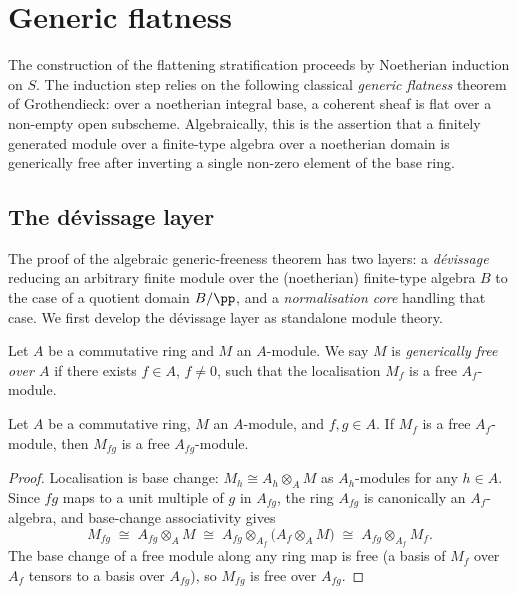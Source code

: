 \section{Generic flatness}
\label{sec:generic_flatness}

The construction of the flattening stratification proceeds by Noetherian
induction on \(S\). The induction step relies on the following classical
\emph{generic flatness} theorem of Grothendieck: over a noetherian integral
base, a coherent sheaf is flat over a non-empty open subscheme. Algebraically,
this is the assertion that a finitely generated module over a finite-type
algebra over a noetherian domain is generically free after inverting a single
non-zero element of the base ring.

\subsection{The dévissage layer}
\label{sec:generic_freeness_devissage}

The proof of the algebraic generic-freeness theorem has two layers: a
\emph{dévissage} reducing an arbitrary finite module over the (noetherian)
finite-type algebra \(B\) to the case of a quotient domain \(B/\pp\), and a
\emph{normalisation core} handling that case. We first develop the dévissage
layer as standalone module theory.

\begin{definition}
  \label{def:generically_free}
  Let \(A\) be a commutative ring and \(M\) an \(A\)-module.  We say \(M\) is
  \emph{generically free over \(A\)} if there exists \(f \in A\), \(f \ne 0\),
  such that the localisation \(M_f\) is a free \(A_f\)-module.
\end{definition}

\begin{lemma}
  \label{lem:generically_free_transport}
  Let \(A\) be a commutative ring, \(M\) an \(A\)-module, and \(f, g \in A\).
  If \(M_f\) is a free \(A_f\)-module, then \(M_{fg}\) is a free
  \(A_{fg}\)-module.
\end{lemma}

\begin{proof}
\leanok
  Localisation is base change: \(M_h \cong A_h \otimes_A M\) as
  \(A_h\)-modules for any \(h \in A\).  Since \(fg\) maps to a unit multiple
  of \(g\) in \(A_{fg}\), the ring \(A_{fg}\) is canonically an
  \(A_f\)-algebra, and base-change associativity gives
  \[
    M_{fg} \;\cong\; A_{fg} \otimes_A M
    \;\cong\; A_{fg} \otimes_{A_f} \bigl(A_f \otimes_A M\bigr)
    \;\cong\; A_{fg} \otimes_{A_f} M_f .
  \]
  The base change of a free module along any ring map is free (a basis of
  \(M_f\) over \(A_f\) tensors to a basis over \(A_{fg}\)), so \(M_{fg}\) is
  free over \(A_{fg}\).
\end{proof}

